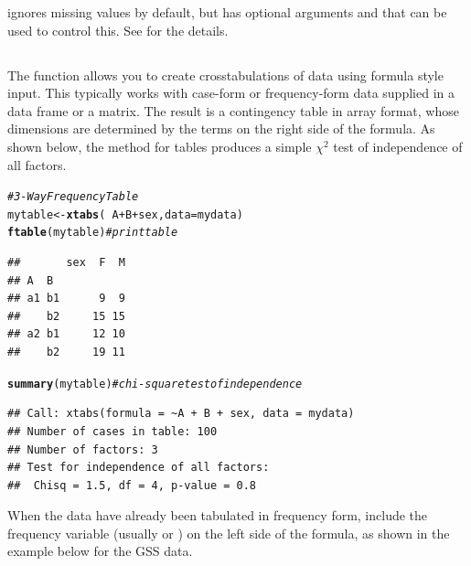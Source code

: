 \documentclass[11pt]{book}\usepackage[]{graphicx}\usepackage[]{color}
\makeatletter
\newcommand{\hlcom}[1]{\textcolor[rgb]{0.678,0.584,0.686}{\textit{#1}}}%
\newcommand{\hlopt}[1]{\textcolor[rgb]{0,0,0}{#1}}%
\newcommand{\hlstd}[1]{\textcolor[rgb]{0.345,0.345,0.345}{#1}}%
\newcommand{\hlkwb}[1]{\textcolor[rgb]{0.69,0.353,0.396}{#1}}%
\newcommand{\hlkwc}[1]{\textcolor[rgb]{0.333,0.667,0.333}{#1}}%
\newcommand{\hlkwd}[1]{\textcolor[rgb]{0.737,0.353,0.396}{\textbf{#1}}}%
\newenvironment{kframe}{%
 \def\at@end@of@kframe{}%
 \ifinner\ifhmode%
  \def\at@end@of@kframe{\end{minipage}}%
  \begin{minipage}{\columnwidth}%
 \fi\fi%
 \def\FrameCommand##1{\hskip\@totalleftmargin \hskip-\fboxsep
 \colorbox{shadecolor}{##1}\hskip-\fboxsep
     \hskip-\linewidth \hskip-\@totalleftmargin \hskip\columnwidth}%
 \MakeFramed {\advance\hsize-\width
   \@totalleftmargin\z@ \linewidth\hsize
   \@setminipage}}%
 {\par\unskip\endMakeFramed%
 \at@end@of@kframe}
\newenvironment{knitrout}{}{} %
\renewenvironment{knitrout}{\small\renewcommand{\baselinestretch}{.85}}{} %
\makeatother
\begin{document}
  ignores missing values by default, but has optional arguments
 and  that can be used to control this.
See  for the details.

\subsection[xtabs()]{}\label{sec:xtabs}

The  function allows you to create crosstabulations of data using formula style input.
This typically works with case-form or frequency-form data
supplied in a data frame or a matrix.
The result is a contingency table in array format, whose dimensions are determined by the terms on the right side of the formula.  As shown below, the  method
for tables produces a simple $\chi^2$ test of independence of all factors.

\begin{knitrout}
\color{fgcolor}\begin{kframe}
\begin{alltt}
\hlcom{# 3-Way Frequency Table}
\hlstd{mytable} \hlkwb{<-} \hlkwd{xtabs}\hlstd{(}\hlopt{~}\hlstd{A}\hlopt{+}\hlstd{B}\hlopt{+}\hlstd{sex,} \hlkwc{data}\hlstd{=mydata)}
\hlkwd{ftable}\hlstd{(mytable)}    \hlcom{# print table}
\end{alltt}
\begin{verbatim}
##       sex  F  M
## A  B           
## a1 b1      9  9
##    b2     15 15
## a2 b1     12 10
##    b2     19 11
\end{verbatim}
\begin{alltt}
\hlkwd{summary}\hlstd{(mytable)}   \hlcom{# chi-square test of independence}
\end{alltt}
\begin{verbatim}
## Call: xtabs(formula = ~A + B + sex, data = mydata)
## Number of cases in table: 100 
## Number of factors: 3 
## Test for independence of all factors:
## 	Chisq = 1.5, df = 4, p-value = 0.8
\end{verbatim}
\end{kframe}
\end{knitrout}


When the data have already been tabulated in frequency form, include the
frequency variable (usually  or )
on the left side of the formula, as shown in the example below for the GSS data.
\end{document}
